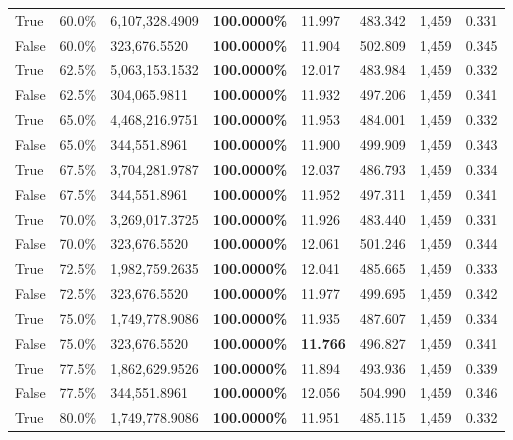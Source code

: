 \begin{table}[H]
\begin{tabular}{lllrllll}
\cline{1-8}
True & 60.0\% & 6,107,328.4909 & \bfseries \color{red} 100.0000\% & 11.997 & 483.342 & 1,459 & 0.331 \\
\cline{1-8}
False & 60.0\% & 323,676.5520 & \bfseries \color{red} 100.0000\% & 11.904 & 502.809 & 1,459 & 0.345 \\
\cline{1-8}
True & 62.5\% & 5,063,153.1532 & \bfseries \color{red} 100.0000\% & 12.017 & 483.984 & 1,459 & 0.332 \\
\cline{1-8}
False & 62.5\% & \color{red} 304,065.9811 & \bfseries \color{red} 100.0000\% & 11.932 & 497.206 & 1,459 & 0.341 \\
\cline{1-8}
True & 65.0\% & 4,468,216.9751 & \bfseries \color{red} 100.0000\% & 11.953 & 484.001 & 1,459 & 0.332 \\
\cline{1-8}
False & 65.0\% & 344,551.8961 & \bfseries \color{red} 100.0000\% & 11.900 & 499.909 & 1,459 & 0.343 \\
\cline{1-8}
True & 67.5\% & 3,704,281.9787 & \bfseries \color{red} 100.0000\% & 12.037 & 486.793 & 1,459 & 0.334 \\
\cline{1-8}
False & 67.5\% & 344,551.8961 & \bfseries \color{red} 100.0000\% & 11.952 & 497.311 & 1,459 & 0.341 \\
\cline{1-8}
True & 70.0\% & 3,269,017.3725 & \bfseries \color{red} 100.0000\% & 11.926 & 483.440 & 1,459 & 0.331 \\
\cline{1-8}
False & 70.0\% & 323,676.5520 & \bfseries \color{red} 100.0000\% & 12.061 & 501.246 & 1,459 & 0.344 \\
\cline{1-8}
True & 72.5\% & 1,982,759.2635 & \bfseries \color{red} 100.0000\% & 12.041 & 485.665 & 1,459 & 0.333 \\
\cline{1-8}
False & 72.5\% & 323,676.5520 & \bfseries \color{red} 100.0000\% & 11.977 & 499.695 & 1,459 & 0.342 \\
\cline{1-8}
True & 75.0\% & 1,749,778.9086 & \bfseries \color{red} 100.0000\% & 11.935 & 487.607 & 1,459 & 0.334 \\
\cline{1-8}
False & 75.0\% & 323,676.5520 & \bfseries \color{red} 100.0000\% & \bfseries \color{red} 11.766 & 496.827 & 1,459 & 0.341 \\
\cline{1-8}
True & 77.5\% & 1,862,629.9526 & \bfseries \color{red} 100.0000\% & 11.894 & 493.936 & 1,459 & 0.339 \\
\cline{1-8}
False & 77.5\% & 344,551.8961 & \bfseries \color{red} 100.0000\% & 12.056 & 504.990 & 1,459 & 0.346 \\
\cline{1-8}
True & 80.0\% & 1,749,778.9086 & \bfseries \color{red} 100.0000\% & 11.951 & 485.115 & 1,459 & 0.332 \\

\end{tabular}
\end{table}
